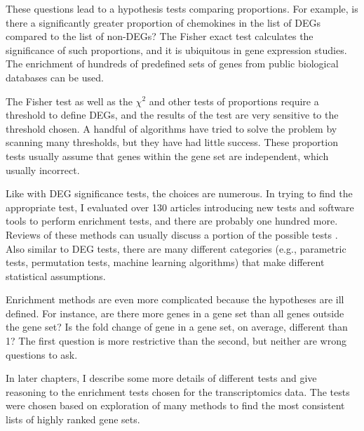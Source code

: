 These questions lead to a hypothesis tests comparing proportions. For example,
is there a significantly greater proportion of chemokines in the list
of DEGs compared to the list of non-DEGs?
The Fisher exact test calculates the significance of such proportions, and it
is ubiquitous in gene expression studies. The enrichment of hundreds
of predefined sets of genes from public biological databases can be used.

The Fisher test as well as the $\chi^2$ and other tests of proportions
require a threshold to define DEGs, and the results of the test are
very sensitive to the threshold chosen. A handful of algorithms have
tried to solve the problem by scanning many thresholds, but they
have had little success. These proportion tests usually assume that genes within the
gene set are independent, which usually incorrect.

Like with DEG significance tests, the choices are numerous.
In trying to find the appropriate test, I evaluated over 130 articles
introducing new tests and software tools to perform enrichment tests, and there
are probably one hundred more.
Reviews of these methods can usually discuss a portion of 
the possible tests \cite{Ackermann:2009bw,Huang:2009bea,Abatangelo:2009cc,
Berg:2009tu,Dinu:2008tv}.
Also similar to DEG tests, there are many different categories (e.g., 
parametric tests, permutation tests, machine learning algorithms)
that make different statistical assumptions.

Enrichment methods are even more complicated because the hypotheses
are ill defined. For instance, are there more genes in a gene set
than all genes outside the gene set? Is the fold change of gene
in a gene set, on average, different than 1? The first question
is more restrictive than the second, but neither are wrong questions
to ask.

In later chapters, I describe some more details of different tests
and give reasoning to the enrichment tests chosen for
the transcriptomics data. The tests were chosen based on exploration
of many methods to find the most consistent lists of highly ranked
gene sets. 












